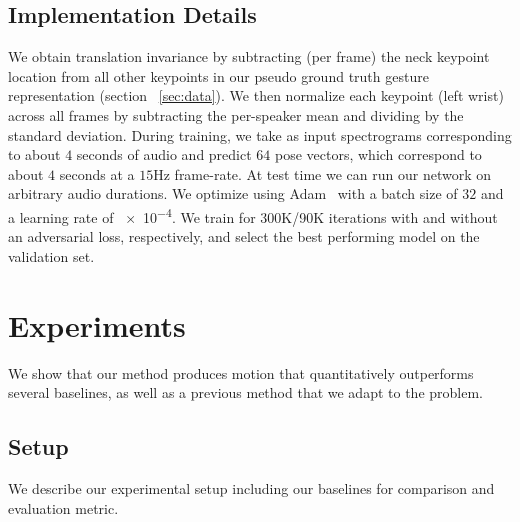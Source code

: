 \documentclass[10pt,twocolumn,letterpaper]{article}
\begin{document}
\subsection{Implementation Details}
We obtain translation invariance by subtracting (per frame) the neck keypoint location from all other keypoints in our pseudo ground truth gesture representation (section ~\ref{sec:data}). We then normalize each keypoint (\eg left wrist) across all frames by subtracting the per-speaker mean and dividing by the standard deviation. During training, we take as input spectrograms corresponding to about $4$ seconds of audio and predict $64$ pose vectors, which correspond to about $4$ seconds at a $15$Hz frame-rate. At test time we can run our network on arbitrary audio durations. We optimize using Adam~\cite{adam} with a batch size of $32$ and a learning rate of \num{e-4}.
We train for 300K/90K iterations with and without an adversarial loss, respectively, and select the best performing model on the validation set.

\section{Experiments}
We show that our method produces motion that quantitatively outperforms several baselines, as well as a previous method that we adapt to the problem.

\subsection{Setup}
We describe our experimental setup including our baselines for comparison and evaluation metric.

\vspace{-3mm}
\end{document}
